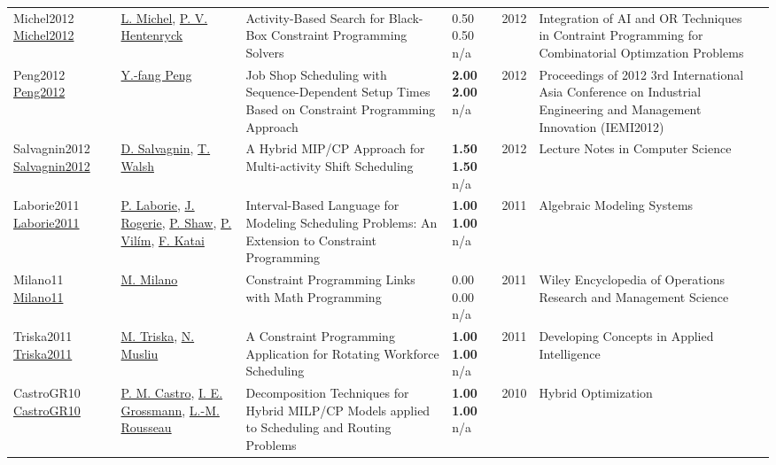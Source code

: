 {\begin{longtable}{p{3cm}p{5cm}p{10cm}p{1cm}rp{2.5cm}l}
Michel2012 \href{http://dx.doi.org/10.1007/978-3-642-29828-8_15}{Michel2012} & \hyperref[auth:a32]{L. Michel}, \hyperref[auth:a148]{P. V. Hentenryck} & Activity-Based Search for Black-Box Constraint Programming Solvers & \noindent{}0.50 0.50 n/a & 2012 & Integration of AI and OR Techniques in Contraint Programming for Combinatorial Optimzation Problems & \cite{Michel2012}\\
Peng2012 \href{http://dx.doi.org/10.1007/978-3-642-33012-4_83}{Peng2012} & \hyperref[auth:a1610]{Y.-fang Peng} & Job Shop Scheduling with Sequence-Dependent Setup Times Based on Constraint Programming Approach & \noindent{}\textbf{2.00} \textbf{2.00} n/a & 2012 & Proceedings of 2012 3rd International Asia Conference on Industrial Engineering and Management Innovation (IEMI2012) & \cite{Peng2012}\\
Salvagnin2012 \href{http://dx.doi.org/10.1007/978-3-642-33558-7_46}{Salvagnin2012} & \hyperref[auth:a1577]{D. Salvagnin}, \hyperref[auth:a276]{T. Walsh} & A Hybrid MIP/CP Approach for Multi-activity Shift Scheduling & \noindent{}\textbf{1.50} \textbf{1.50} n/a & 2012 & Lecture Notes in Computer Science & \cite{Salvagnin2012}\\
Laborie2011 \href{http://dx.doi.org/10.1007/978-3-642-23592-4_6}{Laborie2011} & \hyperref[auth:a118]{P. Laborie}, \hyperref[auth:a1675]{J. Rogerie}, \hyperref[auth:a120]{P. Shaw}, \hyperref[auth:a1676]{P. Vilím}, \hyperref[auth:a1677]{F. Katai} & Interval-Based Language for Modeling Scheduling Problems: An Extension to Constraint Programming & \noindent{}\textbf{1.00} \textbf{1.00} n/a & 2011 & Algebraic Modeling Systems & \cite{Laborie2011}\\
Milano11 \href{http://dx.doi.org/10.1002/9780470400531.eorms0473}{Milano11} & \hyperref[auth:a143]{M. Milano} & Constraint Programming Links with Math Programming & \noindent{}\textcolor{black!50}{0.00} \textcolor{black!50}{0.00} n/a & 2011 & Wiley Encyclopedia of Operations Research and Management Science & \cite{Milano11}\\
Triska2011 \href{http://dx.doi.org/10.1007/978-3-642-21332-8_12}{Triska2011} & \hyperref[auth:a1846]{M. Triska}, \hyperref[auth:a45]{N. Musliu} & A Constraint Programming Application for Rotating Workforce Scheduling & \noindent{}\textbf{1.00} \textbf{1.00} n/a & 2011 & Developing Concepts in Applied Intelligence & \cite{Triska2011}\\
CastroGR10 \href{http://dx.doi.org/10.1007/978-1-4419-1644-0_4}{CastroGR10} & \hyperref[auth:a891]{P. M. Castro}, \hyperref[auth:a382]{I. E. Grossmann}, \hyperref[auth:a326]{L.-M. Rousseau} & Decomposition Techniques for Hybrid MILP/CP Models applied to Scheduling and Routing Problems & \noindent{}\textbf{1.00} \textbf{1.00} n/a & 2010 & Hybrid Optimization & \cite{CastroGR10}\\

\end{longtable}}
